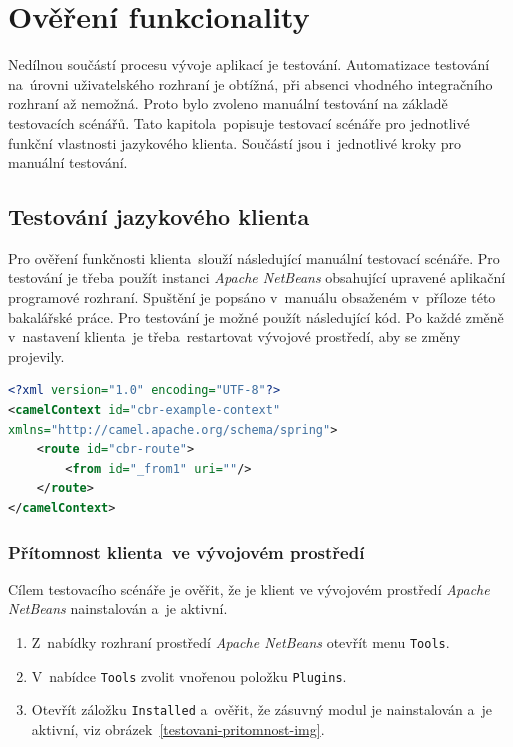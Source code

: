 \chapter{Ověření funkcionality}
\label{overeniFunkcnosti}
Nedílnou součástí procesu vývoje aplikací je testování. Automatizace testování na~úrovni uživatelského rozhraní je obtížná, při absenci vhodného integračního rozhraní až nemožná. Proto bylo zvoleno manuální testování na základě testovacích scénářů. Tato kapitola~popisuje testovací scénáře pro jednotlivé funkční vlastnosti jazykového klienta. Součástí jsou i~jednotlivé kroky pro manuální testování.

\section{Testování jazykového klienta}
Pro ověření funkčnosti klienta~slouží následující manuální testovací
scénáře. Pro testování je třeba použít instanci \emph{Apache NetBeans} obsahující upravené aplikační programové rozhraní. Spuštění je popsáno v~manuálu obsaženém v~příloze této bakalářské práce. Pro testování je možné použít následující kód. Po každé změně v~nastavení klienta~je třeba~restartovat vývojové prostředí, aby se změny projevily.
    \begin{lstlisting}[language=XML, label={lst:camelrouteexamplekod}, caption=Kód použitý v~testovacích scénářích.]
<?xml version="1.0" encoding="UTF-8"?>
<camelContext id="cbr-example-context"
xmlns="http://camel.apache.org/schema/spring">
    <route id="cbr-route">
        <from id="_from1" uri=""/>
    </route>
</camelContext>
    \end{lstlisting}

\subsection{Přítomnost klienta~ve vývojovém prostředí}
Cílem testovacího scénáře je ověřit, že je klient ve vývojovém prostředí \emph{Apache NetBeans} nainstalován a~je aktivní.
\begin{enumerate}
    \item Z~nabídky rozhraní prostředí \emph{Apache NetBeans} otevřít menu \texttt{Tools}.
    \item V~nabídce \texttt{Tools} zvolit vnořenou položku \texttt{Plugins}.
    \item Otevřít záložku \texttt{Installed} a~ověřit, že zásuvný modul je nainstalován a~je aktivní, viz obrázek~\ref{testovani-pritomnost-img}.
\end{enumerate}

